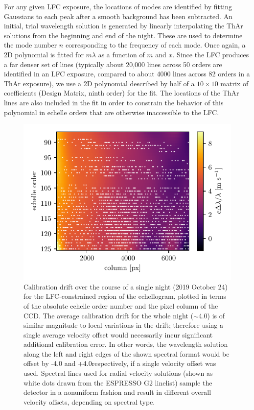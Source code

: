 For any given LFC exposure, the locations of modes are identified by fitting Gaussians to each peak after a smooth background has been subtracted. An initial, trial wavelength solution is generated by linearly interpolating the ThAr solutions from the beginning and end of the night. These are used to determine the mode number \(n\) corresponding to the frequency of each mode. Once again, a 2D polynomial is fitted for \(m\lambda\) as a function of \(m\) and \(x\). Since the LFC produces a far denser set of lines (typically about 20,000 lines across 50 orders are identified in an LFC exposure, compared to about 4000 lines across 82 orders in a ThAr exposure), we use a 2D polynomial described by half of a $10\times10$ matrix of coefficients (Design Matrix, ninth order) for the fit. The locations of the ThAr lines are also included in the fit in order to constrain the behavior of this polynomial in echelle orders that are otherwise inaccessible to the LFC.

\begin{figure}[htbp]
    \centering
    \includegraphics[width=\textwidth]{figures-4/drift.pdf}
    \caption[EXPRES wavelength calibration drift]{Calibration drift over the course of a single night (2019 October 24) for the LFC-constrained region of the echellogram, plotted in terms of the absolute echelle order number and the pixel column of the CCD. The average calibration drift for the whole night ($\sim$4.0\ms) is of similar magnitude to local variations in the drift; therefore using a single average velocity offset would necessarily incur significant additional calibration error. In other words, the wavelength solution along the left and right edges of the shown spectral format would be offset by -4.0 and +4.0\ms respectively, if a single velocity offset was used. Spectral lines used for radial-velocity solutions (shown as white dots drawn from the ESPRESSO G2 linelist) sample the detector in a nonuniform fashion and result in different overall velocity offsets, depending on spectral type.}
    \label{fig:caldrift}
\end{figure}

